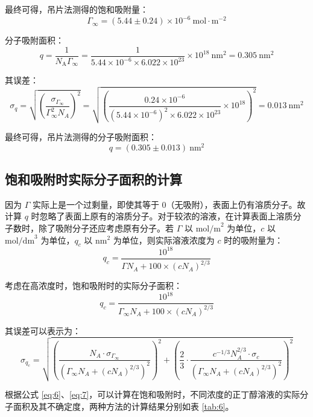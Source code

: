 最终可得，吊片法测得的饱和吸附量：
$$
\Gamma_{\infty}=(5.44 \pm 0.24) \times 10^{-6} \mathrm{~mol} \cdot \mathrm{m}^{-2}
$$

分子吸附面积：
$$
q = \frac{1}{N_{\mathrm{A}}\Gamma_{\infty}} = \frac{1}{5.44 \times 10^{-6} \times 6.022 \times 10^{23}} \times 10^{18} \mathrm{~nm}^2=0.305 \mathrm{~nm}^2
$$

其误差：
$$
\sigma_q=\sqrt{\left(\frac{\sigma_{\Gamma_{\infty}}}{\Gamma_{\infty}^2 N_A}\right)^2}=\sqrt{\left(\frac{0.24 \times 10^{-6}}{\left(5.44 \times 10^{-6}\right)^2 \times 6.022 \times 10^{23}} \times 10^{18}\right)^2}=0.013 \mathrm{~nm}^2
$$

最终可得，吊片法测得的分子吸附面积：
$$
q = (0.305\pm 0.013) \mathrm{~nm}^2
$$

\subsection{饱和吸附时实际分子面积的计算}

因为 $\Gamma$ 实际上是一个过剩量，即使其等于 0（无吸附），表面上仍有溶质分子。故计算 $q$ 时忽略了表面上原有的溶质分子。对于较浓的溶液，在计算表面上溶质分子数时，除了吸附分子还应考虑原有分子。若 $\Gamma$ 以 $\mathrm{mol/m}^2$ 为单位，$c$ 以 $\mathrm{mol/dm}^3$ 为单位，$q_c$ 以 $\mathrm{nm}^2$ 为单位，则实际溶液浓度为 $c$ 时的吸附量为：
$$
q_c = \frac{10^{18}}{\Gamma N_A + 100 \times \left( c N_A \right)^{2/3}}
$$

考虑在高浓度时，饱和吸附时的实际分子面积：
\begin{equation}\label{eq:6}
    q_c = \frac{10^{18}}{\Gamma_\infty N_A + 100 \times \left( c N_A \right)^{2/3}}
\end{equation}


其误差可以表示为：
\begin{equation}\label{eq:7}
    \sigma_{q_c}=\sqrt{\left(\frac{N_A \cdot \sigma_{\Gamma_{\infty}}}{\left(\Gamma_{\infty} N_A+\left(c N_A\right)^{2 / 3}\right)^2}\right)^2+\left(\frac{2}{3} \cdot \frac{c^{-1 / 3} N_A^{2 / 3} \cdot \sigma_c}{\left(\Gamma_{\infty} N_A+\left(c N_A\right)^{2 / 3}\right)^2}\right)^2}
\end{equation}


根据公式 \eqref{eq:6}、\eqref{eq:7}，可以计算在饱和吸附时，不同浓度的正丁醇溶液的实际分子面积及其不确定度，两种方法的计算结果分别如表 \ref{tab:6}。

